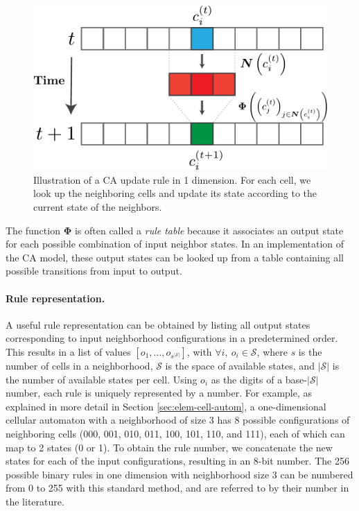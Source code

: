 \begin{figure}[htbp]
  \centering
 \includegraphics[width=.7\linewidth]{figures/ca_base}
  \caption{Illustration of a \acl{CA} update rule in 1 dimension. For each cell,
  we look up the neighboring cells and update its state according to the current
state of the neighbors.}
  \label{fig:ca_base}
\end{figure}

The function $\boldsymbol{\Phi}$ is often called a \emph{rule table} because it
associates an output state for each possible combination of input neighbor
states. In an implementation of the \ac{CA} model, these output states can be
looked up from a table containing all possible transitions from input to output.

\paragraph{Rule representation.}
A useful rule representation can be obtained by listing all output states
corresponding to input neighborhood configurations in a predetermined order. This 
results in a list of values $[o_1, \ldots, o_{s^{|\mathcal{S}|}}]$, with 
$\forall i,\ o_{i} \in \mathcal{S}$, where $s$ is
the number of cells in a neighborhood, $\mathcal{S}$ is the space of available states, and
$|\mathcal{S}|$ is the number of available states per cell. Using $o_{i}$ as the
digits of a base-$|\mathcal{S}|$ number, each rule is uniquely represented by a number.
For example, as explained in more detail in Section \ref{sec:elem-cell-autom},
a one-dimensional cellular automaton with a neighborhood of size 3 has 8 possible configurations of neighboring cells (000, 001, 010, 011, 100, 101, 110, and 111), each of which can map to 2 states (0 or 1). To obtain the rule number, we concatenate the new states for each of the input configurations, resulting in an 8-bit number. 
The 256 possible binary rules in one dimension with neighborhood size 3 can be numbered
from 0 to 255 with this standard method, and are referred to by their number in the literature.

